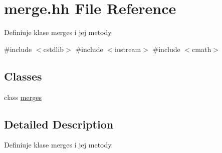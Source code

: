 \hypertarget{merge_8hh}{\section{merge.\-hh \-File \-Reference}
\label{merge_8hh}
}


\-Definiuje klase merges i jej metody.  


{\ttfamily \#include $<$cstdlib$>$}\*
{\ttfamily \#include $<$iostream$>$}\*
{\ttfamily \#include $<$cmath$>$}\*
\subsection*{\-Classes}
\begin{DoxyCompactItemize}
\item 
class \hyperlink{classmerges}{merges}
\end{DoxyCompactItemize}


\subsection{\-Detailed \-Description}
\-Definiuje klase merges i jej metody. 